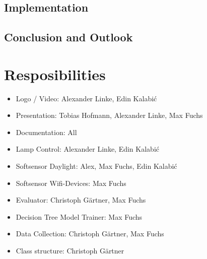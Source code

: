 \documentclass{article}
\begin{document}
 \label{section:2}

\section{Implementation}



\section{Conclusion and Outlook}



\chapter*{Resposibilities}

\begin{itemize}
\item Logo / Video: Alexander Linke, Edin Kalabić
\item Presentation: Tobias Hofmann, Alexander Linke, Max Fuchs
\item Documentation: All
\item Lamp Control: Alexander Linke, Edin Kalabić
\item Softsensor Daylight: Alex, Max Fuchs, Edin Kalabić
\item Softsensor Wifi-Devices: Max Fuchs
\item Evaluator: Christoph Gärtner, Max Fuchs
\item Decision Tree Model Trainer: Max Fuchs
\item Data Collection: Christoph Gärtner, Max Fuchs
\item Class structure: Christoph Gärtner
\end{itemize}










\end{document}
